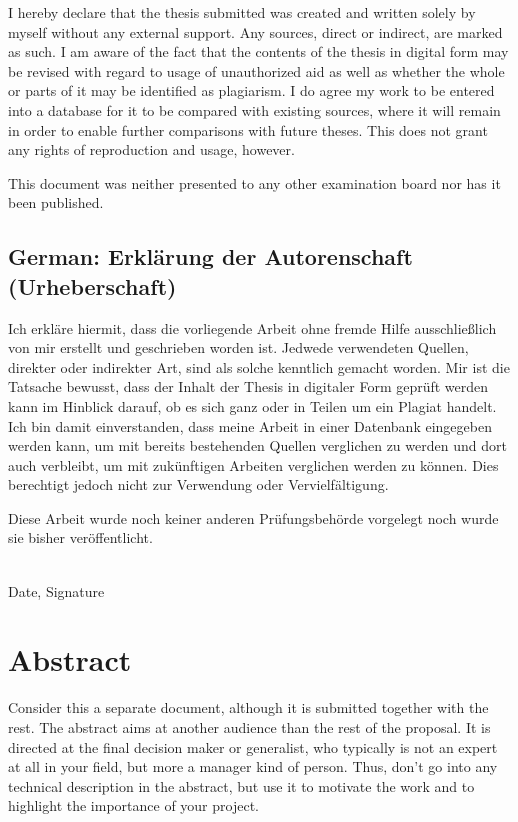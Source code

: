 \documentclass[a4paper,11pt,oneside]{article}
\begin{document}
I hereby declare that the thesis submitted was created and written
solely by myself without any external support. Any sources, direct
or indirect, are marked as such. I am aware of the fact that the
contents of the thesis in digital form may be revised with regard to
usage of unauthorized aid as well as whether the whole or parts of
it may be identified as plagiarism. I do agree my work to be entered
into a database for it to be compared with existing sources, where
it will remain in order to enable further comparisons with future
theses. This does not grant any rights of reproduction and usage,
however.

This document was neither presented to any other examination board
nor has it been published.

\subsection*{German: Erklärung der Autorenschaft (Urheberschaft)}

Ich erkläre hiermit, dass die vorliegende Arbeit ohne fremde Hilfe
ausschließlich von mir erstellt und geschrieben worden ist. Jedwede
verwendeten Quellen, direkter oder indirekter Art, sind als solche
kenntlich gemacht worden. Mir ist die Tatsache bewusst, dass der
Inhalt der Thesis in digitaler Form geprüft werden kann im Hinblick
darauf, ob es sich ganz oder in Teilen um ein Plagiat handelt. Ich
bin damit einverstanden, dass meine Arbeit in einer Datenbank
eingegeben werden kann, um mit bereits bestehenden Quellen
verglichen zu werden und dort auch verbleibt, um mit zukünftigen
Arbeiten verglichen werden zu können. Dies berechtigt jedoch nicht
zur Verwendung oder Vervielfältigung.

Diese Arbeit wurde noch keiner anderen Prüfungsbehörde vorgelegt
noch wurde sie bisher veröffentlicht.

\vspace{20mm}

\dotfill\\
Date, Signature

\newpage

\section*{Abstract}

Consider this a separate document, although it is submitted together
with the rest. The abstract aims at another audience than the rest
of the proposal. It is directed at the final decision maker or
generalist, who typically is not an expert at all in your field, but
more a manager kind of person. Thus, don't go into any technical
description in the abstract, but use it to motivate the work and to
highlight the importance of your project.
\end{document}
